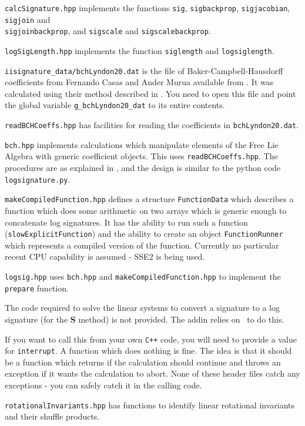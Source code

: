 \documentclass[a4paper]{extarticle}
\begin{document}
\begin{description}
\item{\verb|calcSignature.hpp|} implements the functions \verb|sig|, \verb|sigbackprop|, \verb|sigjacobian|, \verb|sigjoin| and \\ \verb|sigjoinbackprop|, and \verb|sigscale| and \verb|sigscalebackprop|.

\item{\verb|logSigLength.hpp|} implements the function \verb|siglength| and \verb|logsiglength|.
\item{\verb|iisignature_data/bchLyndon20.dat|} is the file of Baker-Campbell-Hausdorff coefficients from Fernando Casas and Ander Murua available from \cite{bchinfo}. It was calculated using their method described in \cite{bch}. You need to open this file and point the global variable \verb|g_bchLyndon20_dat| to its entire contents.
\item{\verb|readBCHCoeffs.hpp|} has facilities for reading the coefficients in \verb|bchLyndon20.dat|.
\item{\verb|bch.hpp|} implements calculations which manipulate elements of the Free Lie Algebra with generic coefficient objects. This uses \verb|readBCHCoeffs.hpp|. The procedures are as explained in \cite{LOGSIG}, and the design is similar to the python code \verb|logsignature.py|.
\item{\verb|makeCompiledFunction.hpp|} defines a structure \verb|FunctionData| which describes a function which does some arithmetic on two arrays which is generic enough to concatenate log signatures. It has the ability to run such a function (\verb|slowExplicitFunction|) and the ability to create an object \verb|FunctionRunner| which represents a compiled version of the function. Currently no particular recent CPU capability is assumed - SSE2 is being used.
\item{\verb|logsig.hpp|} uses \verb|bch.hpp| and \verb|makeCompiledFunction.hpp| to implement the \verb|prepare| function. 

The code required to solve the linear systems to convert a signature to a log signature (for the \textbf{S} method) is not provided. The addin relies on \numpy\ to do this.

If you want to call this from your own \verb|C++| code, you will need to provide a value for \verb|interrupt|. A function which does nothing is fine. The idea is that it should be a function which returns if the calculation should continue and throws an exception if it wants the calculation to abort. None of these header files catch any exceptions - you can safely catch it in the calling code.

\item{\verb|rotationalInvariants.hpp|} has functions to identify linear rotational invariants and their shuffle products.
\end{description}
\end{document}
